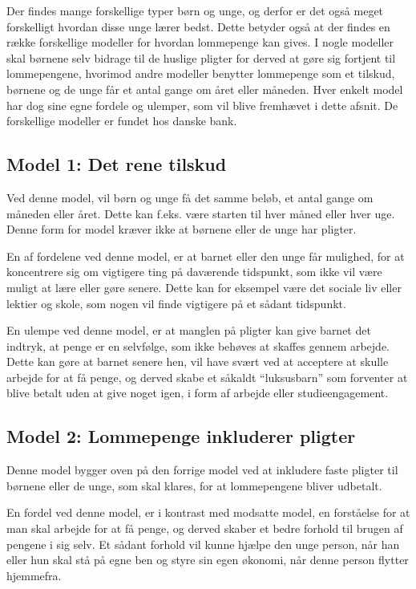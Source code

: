 Der findes mange forskellige typer børn og unge, 
og derfor er det også meget forskelligt hvordan 
disse unge lærer bedst. Dette betyder også at 
der findes en række forskellige modeller for 
hvordan lommepenge kan gives. I nogle modeller 
skal børnene selv bidrage til de huslige pligter 
for derved at gøre sig fortjent til 
lommepengene, hvorimod andre modeller benytter 
lommepenge som et tilskud, børnene og de unge 
får et antal gange om året eller måneden. Hver 
enkelt model har dog sine egne fordele og 
ulemper, som vil blive fremhævet i dette afsnit. 
De forskellige modeller er fundet hos danske 
bank.

\subsection{Model 1: Det rene tilskud}
Ved denne model, vil børn og unge få det samme 
beløb, et antal gange om måneden eller året. 
Dette kan f.eks. være starten til hver måned 
eller hver uge. Denne form for model kræver ikke 
at børnene eller de unge har pligter.

En af fordelene ved denne model, er at barnet 
eller den unge får mulighed, for at koncentrere 
sig om vigtigere ting på daværende tidspunkt, 
som ikke vil være muligt at lære eller gøre 
senere. Dette kan for eksempel være det sociale 
liv eller lektier og skole, som nogen vil finde 
vigtigere på et sådant tidspunkt.

En ulempe ved denne model, er at manglen på 
pligter kan give barnet det indtryk, at penge er 
en selvfølge, som ikke behøves at skaffes gennem 
arbejde. Dette kan gøre at barnet senere hen, 
vil have svært ved at acceptere at skulle 
arbejde for at få penge, og derved skabe et 
såkaldt “luksusbarn” som forventer at blive 
betalt uden at give noget igen, i form af 
arbejde eller studieengagement.

\subsection{Model 2: Lommepenge inkluderer 
pligter}
Denne model bygger oven på den forrige model ved 
at inkludere faste pligter til børnene eller de 
unge, som skal klares, for at lommepengene 
bliver udbetalt.

En fordel ved denne model, er i kontrast med 
modsatte model, en forståelse for at man skal 
arbejde for at få penge, og derved skaber et 
bedre forhold til brugen af pengene i sig selv. 
Et sådant forhold vil kunne hjælpe den unge 
person, når han eller hun skal stå på egne ben 
og styre sin egen økonomi, når denne person 
flytter hjemmefra.

